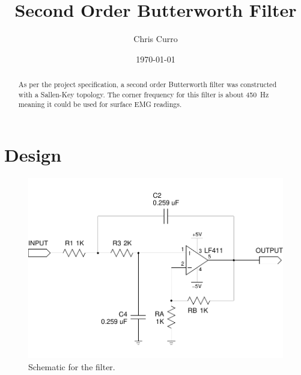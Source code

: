 \documentclass[justified]{tufte-handout}
\title{Second Order Butterworth Filter}
\author{Chris Curro}
\date{\today}
\begin{document}
\maketitle
\begin{abstract}
As per the project specification, a second order Butterworth filter was
constructed with a Sallen-Key topology. The corner frequency for this filter is
about 450~Hz meaning it could be used for surface EMG readings.
\end{abstract}
\section{Design}
\vspace{-0.2in}
\begin{figure}[h]
\centering
\label{schem}
\includegraphics[width=0.9\linewidth,trim=0 .3in 0 .35in,clip=true]{schem.pdf}
\caption{Schematic for the filter.}
\end{figure}
\end{document}
